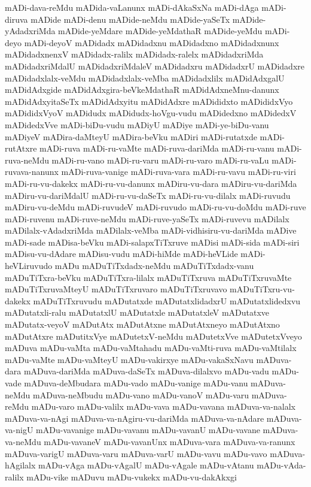 {mADi-dava-reMdu
mADida-vaLanunx
mADi-dAkaSxNa
mADi-dAga
mADi-diruva
mADide
mADi-denu
mADide-neMdu
mADide-yaSeTx
mADide-yAdadxriMda
mADide-yeMdare
mADide-yeMdathaR
mADide-yeMdu
mADi-deyo
mADi-deyoV
mADidadx
mADidadxnu
mADidadxno
mADidadxnunx
mADidadxnenxV
mADidadx-ralilx
mADidadx-ralelx
mADidadxriMda
mADidadxriMdalU
mADidadxriMdaleV
mADidadxru
mADidadxrU
mADidadxre
mADidadxlalx-veMdu
mADidadxlalx-veMba
mADidadxlilx
mADidAdxgalU
mADidAdxgide
mADidAdxgira-beVkeMdathaR
mADidAdxneMnu-danunx
mADidAdxyitaSeTx
mADidAdxyitu
mADidAdxre
mADididxto
mADididxVyo
mADididxVyoV
mADidudx
mADidudx-hoVgu-vudu
mADidedxno
mADidedxV
mADidedxVve
mADi-biDu-vudu
mADiyU
mADiye
mADi-ye-biDu-vanu
mADiyeV
mADira-daMteyU
mADira-beVku
mADiri
mADi-rutatxde
mADi-rutAtxre
mADi-ruva
mADi-ru-vaMte
mADi-ruva-dariMda
mADi-ru-vanu
mADi-ruva-neMdu
mADi-ru-vano
mADi-ru-varu
mADi-ru-varo
mADi-ru-vaLu
mADi-ruvava-nanunx
mADi-ruva-vanige
mADi-ruva-vara
mADi-ru-vavu
mADi-ru-viri
mADi-ru-vu-dakekx
mADi-ru-vu-danunx
mADiru-vu-dara
mADiru-vu-dariMda
mADiru-vu-dariMdalU
mADi-ru-vu-daSeTx
mADi-ru-vu-dilalx
mADi-ruvudu
mADiru-vu-deMdu
mADi-ruvudeV
mADi-ruvudo
mADi-ru-vu-doMdu
mADi-ruve
mADi-ruvenu
mADi-ruve-neMdu
mADi-ruve-yaSeTx
mADi-ruvevu
mADilalx
mADilalx-vAdadxriMda
mADilalx-veMba
mADi-vidhisiru-vu-dariMda
mADive
mADi-sade
mADisa-beVku
mADi-salapxTiTxruve
mADisi
mADi-sida
mADi-siri
mADisu-vu-dAdare
mADisu-vudu
mADi-hiMde
mADi-heVLide
mADi-heVLiruvudo
mADu
mADuTiTxdadx-neMdu
mADuTiTxdadx-vanu
mADuTiTxra-beVku
mADuTiTxra-lilalx
mADuTiTxruva
mADuTiTxruvaMte
mADuTiTxruvaMteyU
mADuTiTxruvaro
mADuTiTxruvavo
mADuTiTxru-vu-dakekx
mADuTiTxruvudu
mADutatxde
mADutatxlidadxrU
mADutatxlidedxvu
mADutatxli-ralu
mADutatxlU
mADutatxle
mADutatxleV
mADutatxve
mADutatx-veyoV
mADutAtx
mADutAtxne
mADutAtxneyo
mADutAtxno
mADutAtxre
mADutitxVye
mADutetxV-neMdu
mADutetxVve
mADutetxVveyo
mADuva
mADu-vaMta
mADu-vaMtahadu
mADu-vaMti-ruva
mADu-vaMtilalx
mADu-vaMte
mADu-vaMteyU
mADu-vakirxye
mADu-vakaSxNavu
mADuva-dara
mADuva-dariMda
mADuva-daSeTx
mADuva-dilalxvo
mADu-vadu
mADu-vade
mADuva-deMbudara
mADu-vado
mADu-vanige
mADu-vanu
mADuva-neMdu
mADuva-neMbudu
mADu-vano
mADu-vanoV
mADu-varu
mADuva-reMdu
mADu-varo
mADu-valilx
mADu-vava
mADu-vavana
mADuva-va-nalalx
mADuva-va-nAgi
mADuva-va-nAgiru-vu-dariMda
mADuva-va-nAdare
mADuva-va-nigU
mADu-vavanige
mADu-vavanu
mADu-vavanU
mADu-vavane
mADuva-va-neMdu
mADu-vavaneV
mADu-vavanUnx
mADuva-vara
mADuva-va-ranunx
mADuva-varigU
mADuva-varu
mADuva-varU
mADu-vavu
mADu-vavo
mADuva-hAgilalx
mADu-vAga
mADu-vAgalU
mADu-vAgale
mADu-vAtanu
mADu-vAda-ralilx
mADu-vike
mADuvu
mADu-vukekx
mADu-vu-dakAkxgi
}
